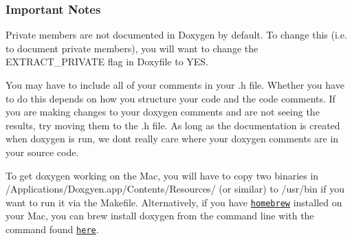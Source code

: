 \subsubsection*{Important Notes}

Private members are not documented in Doxygen by default. To change this (i.\+e. to document private members), you will want to change the {\ttfamily E\+X\+T\+R\+A\+C\+T\+\_\+\+P\+R\+I\+V\+A\+TE} flag in Doxyfile to {\ttfamily Y\+ES}.

You may have to include all of your comments in your .h file. Whether you have to do this depends on how you structure your code and the code comments. If you are making changes to your doxygen comments and are not seeing the results, try moving them to the .h file. As long as the documentation is created when {\ttfamily doxygen} is run, we don\textquotesingle{}t really care where your doxygen comments are in your source code.

To get doxygen working on the Mac, you will have to copy two binaries in /\+Applications/\+Doxgyen.app/\+Contents/\+Resources/ (or similar) to /usr/bin if you want to run it via the Makefile. Alternatively, if you have \href{http://brew.sh/}{\tt homebrew} installed on your Mac, you can brew install doxygen from the command line with the command found \href{http://brewformulas.org/Doxygen}{\tt here}. 